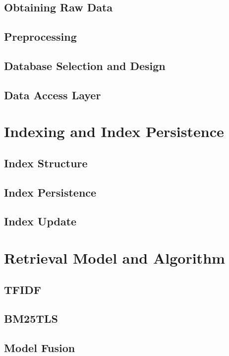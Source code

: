\documentclass[conference]{IEEEtran}
\begin{document}
\subsection{Obtaining Raw Data}

\subsection{Preprocessing}

\subsection{Database Selection and Design}

\subsection{Data Access Layer}

\section{Indexing and Index Persistence}

\subsection{Index Structure}

\subsection{Index Persistence}

\subsection{Index Update}

\section{Retrieval Model and Algorithm}

\subsection{TFIDF}

\subsection{BM25TLS}

\subsection{Model Fusion}
\end{document}
